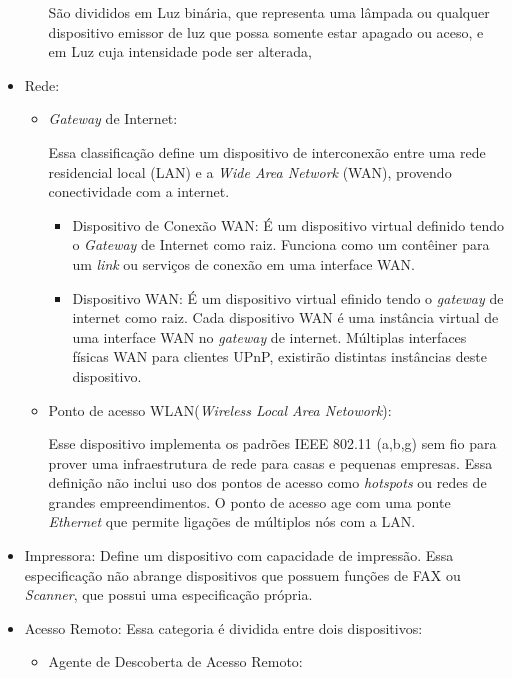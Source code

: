 \begin{itemize}
\begin{itemize}
			São divididos em Luz binária, que representa uma lâmpada ou qualquer dispositivo emissor de luz que possa somente estar apagado ou aceso, e em Luz cuja intensidade pode ser alterada, 
	\end{itemize}

\item Rede:
	\begin{itemize}
		\item \emph{Gateway} de Internet:
			
			Essa classificação define um dispositivo de interconexão entre uma rede residencial local (LAN) e a \emph{Wide Area Network} (WAN), provendo conectividade com a internet.
			\begin{itemize}
				\item Dispositivo de Conexão WAN: É um dispositivo virtual definido tendo o \emph{Gateway} de Internet como raiz. Funciona como um contêiner para um \emph{link} ou serviços de conexão em uma interface WAN. 
				\item Dispositivo WAN: É um dispositivo virtual efinido tendo o \emph{gateway} de internet como raiz. Cada dispositivo WAN é uma instância virtual de uma interface WAN no \emph{gateway} de internet. Múltiplas interfaces físicas WAN para clientes UPnP, existirão distintas instâncias deste dispositivo.
			\end{itemize}

		\item Ponto de acesso WLAN(\emph{Wireless Local Area Netowork}):
			
			Esse dispositivo implementa os padrões IEEE 802.11 (a,b,g) sem fio para prover uma infraestrutura de rede para casas e pequenas empresas. Essa definição não inclui uso dos pontos de acesso como \emph{hotspots} ou redes de grandes empreendimentos. O ponto de acesso age com uma ponte \emph{Ethernet} que permite ligações de múltiplos nós com a LAN.
	\end{itemize}

\item Impressora:
	Define um dispositivo com capacidade de impressão. Essa especificação não abrange dispositivos que possuem funções de FAX ou \emph{Scanner}, que possui uma especificação própria.

\item Acesso Remoto:
	Essa categoria é dividida entre dois dispositivos:
	\begin{itemize}
		\item Agente de Descoberta de Acesso Remoto:


\end{itemize}
\end{itemize}
